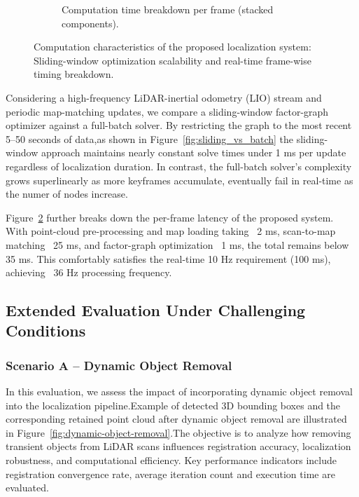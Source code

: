 \begin{figure}[H]
\begin{subfigure}[t]{0.48\textwidth}
		\caption{Computation time breakdown per frame (stacked components).}
		\label{fig:computation_summary}
	\end{subfigure}
	\caption{Computation characteristics of the proposed localization system: Sliding-window optimization scalability and real-time frame-wise timing breakdown.}
	\label{fig:computation_summary}
\end{figure}



Considering a high-frequency LiDAR-inertial odometry (LIO) stream and periodic map-matching updates, we compare a sliding-window factor-graph optimizer against a full-batch solver. By restricting the graph to the most recent 5–50 seconds of data,as shown in Figure~\ref{fig:sliding_vs_batch} the sliding-window approach maintains nearly constant solve times under 1 ms per update regardless of localization duration. In contrast, the full-batch solver’s complexity grows superlinearly as more keyframes accumulate, eventually fail in real‐time as the numer of nodes increase.

Figure~\ref{fig:computation_summary} further breaks down the per-frame latency of the proposed system. With point-cloud pre-processing and map loading taking ~2 ms, scan-to-map matching ~25 ms, and factor-graph optimization ~1 ms, the total remains below 35 ms. This comfortably satisfies the real-time 10 Hz requirement (100 ms), achieving ~36 Hz processing frequency.

\subsection{ Extended Evaluation Under Challenging Conditions}


\subsubsection{Scenario A – Dynamic Object Removal}

In this evaluation, we assess the impact of incorporating dynamic object removal into the localization pipeline.Example of  detected 3D bounding boxes and the corresponding retained point cloud after dynamic object removal are illustrated in Figure~\ref{fig:dynamic-object-removal}.The objective is to analyze how removing transient objects from LiDAR scans influences registration accuracy, localization robustness, and computational efficiency. Key performance indicators include registration convergence rate, average iteration count and  execution time are evaluated.

